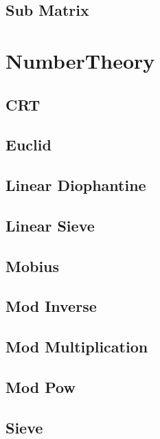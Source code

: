 \subsection{Sub Matrix}
\raggedbottom
\hrulefill
\newpage

\section{NumberTheory}
\subsection{CRT}
\raggedbottom
\hrulefill
\subsection{Euclid}
\raggedbottom
\hrulefill
\subsection{Linear Diophantine}
\raggedbottom
\hrulefill
\subsection{Linear Sieve}
\raggedbottom
\hrulefill
\subsection{Mobius}
\raggedbottom
\hrulefill
\subsection{Mod Inverse}
\raggedbottom
\hrulefill
\subsection{Mod Multiplication}
\raggedbottom
\hrulefill
\subsection{Mod Pow}
\raggedbottom
\hrulefill
\subsection{Sieve}
\raggedbottom
\hrulefill
\newpage


